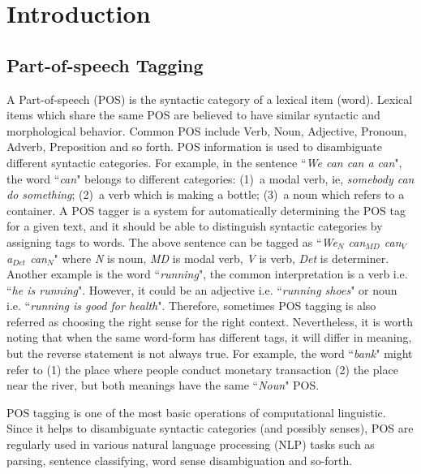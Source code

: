 \chapter{Introduction}
\label{section:intro}


\section{Part-of-speech Tagging}
A Part-of-speech (POS) is the syntactic category of a lexical item (word). Lexical items which share the same POS are believed to have similar syntactic and morphological behavior. Common POS include Verb, Noun, Adjective, Pronoun, Adverb, Preposition and so forth. 
POS information is used to disambiguate different syntactic categories. For example, in the sentence ``\emph{We can can a can}", the word ``\textit{can}" belongs to different categories: (1)~a modal verb, ie, \textit{somebody can do something}; (2)~a verb which is making a bottle; (3)~a noun which refers to a container. A POS tagger is a system for automatically determining the POS tag for a given text, and it should be able to distinguish syntactic categories by assigning tags to words. The above sentence can be tagged as ``\emph{We$_N$ can$_{MD}$ can$_V$ a$_{Det}$ can$_N$}" where \textit{N} is noun, \textit{MD} is modal verb, \textit{V} is verb, \textit{Det} is determiner. Another example is the word ``\textit{running}", the common interpretation is a verb i.e. ``\textit{he is running}". However, it could be an adjective i.e. ``\textit{running shoes}"  or noun i.e. ``\textit{running is good for health}". Therefore, sometimes POS tagging is also referred as choosing the right sense for the right context. Nevertheless, it is worth noting that when the same word-form has different tags, it will differ in meaning, but the reverse statement is not always true. For example, the word ``\textit{bank}" might refer to (1) the place where people conduct monetary transaction (2) the place near the river, but both meanings have the same ``\textit{Noun}" POS. 

POS tagging is one of the most basic operations of computational linguistic. Since it helps to disambiguate syntactic categories (and possibly senses), POS are regularly used in various natural language processing (NLP) tasks such as parsing, sentence classifying, word sense disambiguation and so-forth. 

